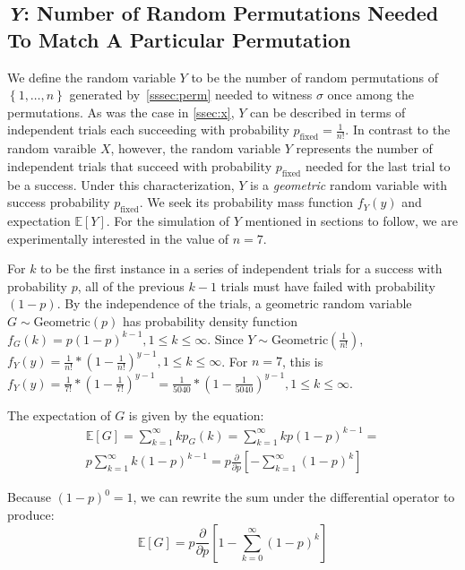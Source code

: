 \documentclass[11pt, oneside]{article}   	%
\begin{document}
\subsection{\textit{Y}: Number of Random Permutations Needed To Match A Particular Permutation}
We define the random variable $Y$ to be the number of random permutations of $\left\{1, \dots, n\right\}$ generated by~\ref{sssec:perm} needed to witness $\sigma$ once among the permutations. As was the case in \ref{ssec:x}, $Y$ can be described in terms of independent trials each succeeding with probability $p_{\text{fixed}} = \frac{1}{n!}$. In contrast to the random varaible $X$, however, the random variable $Y$ represents the number of independent trials that succeed with probability $p_{\text{fixed}}$ needed for the last trial to be a success. Under this characterization, $Y$ is a \textit{geometric} random variable with success probability $p_{\text{fixed}}$. We seek its probability mass function $f_Y(y)$ and expectation $\mathbb{E}[Y]$. For the simulation of $Y$ mentioned in sections to follow, we are experimentally interested in the value of $n = 7$.

For $k$ to be the first instance in a series of independent trials for a success with probability $p$, all of the previous $k - 1$ trials must have failed with probability $(1 - p)$. By the independence of the trials, a geometric random variable $G \sim \text{Geometric}(p)$ has probability density function $f_G(k) = p(1-p)^{k-1}, 1 \leq k \leq \infty$. Since $Y \sim \text{Geometric}(\frac{1}{n!})$, $f_Y(y) = \frac{1}{n!} * (1 - \frac{1}{n!})^{y-1}, 1 \leq k \leq \infty$. For $n = 7$, this is $f_Y(y) = \frac{1}{7!} * (1 - \frac{1}{7!})^{y-1} = \frac{1}{5040} * (1 - \frac{1}{5040})^{y-1}, 1 \leq k \leq \infty$.

The expectation of $G$ is given by the equation:
\begin{equation*}
\begin{split}
\mathbb{E}[G] =
\sum_{k = 1}^{\infty}k p_G(k) =
\sum_{k = 1}^{\infty}k p(1-p)^{k-1} =\\
p \sum_{k = 1}^{\infty}k (1 - p)^{k-1} =
p \frac{\partial}{\partial p} \left[-\sum_{k = 1}^{\infty}(1 - p)^k\right]
\end{split}
\end{equation*}

Because $(1-p)^{0} = 1$, we can rewrite the sum under the differential operator to produce:
\begin{equation*}
\mathbb{E}[G] = p \frac{\partial}{\partial p} \left[1 - \sum_{k = 0}^{\infty}(1 - p)^k\right]
\end{equation*}
\end{document}
